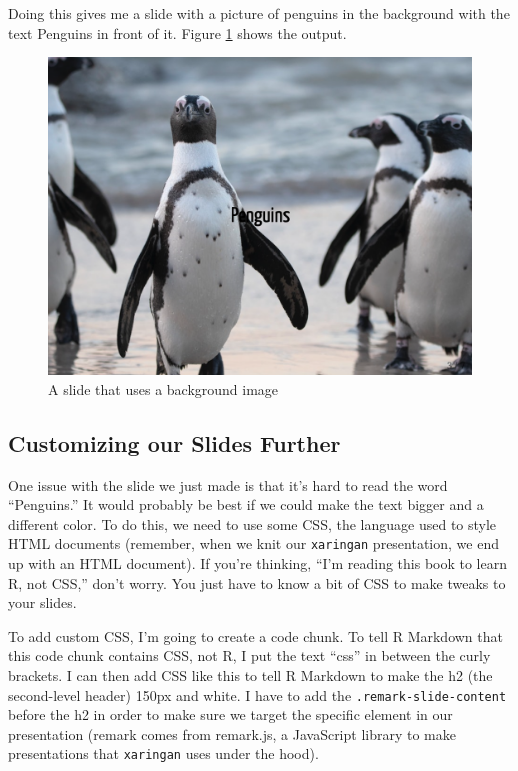 \documentclass[
]{book}
\begin{document}
Doing this gives me a slide with a picture of penguins in the background with the text Penguins in front of it. Figure \ref{fig:xaringan-background-image} shows the output.

\begin{figure}
\includegraphics[width=1\linewidth]{assets/xaringan-background-image} \caption{A slide that uses a background image}\label{fig:xaringan-background-image}
\end{figure}

\hypertarget{customizing-our-slides-further}{%
\subsection*{Customizing our Slides Further}\label{customizing-our-slides-further}}

One issue with the slide we just made is that it's hard to read the word ``Penguins.'' It would probably be best if we could make the text bigger and a different color. To do this, we need to use some CSS, the language used to style HTML documents (remember, when we knit our \texttt{xaringan} presentation, we end up with an HTML document). If you're thinking, ``I'm reading this book to learn R, not CSS,'' don't worry. You just have to know a bit of CSS to make tweaks to your slides.

To add custom CSS, I'm going to create a code chunk. To tell R Markdown that this code chunk contains CSS, not R, I put the text ``css'' in between the curly brackets. I can then add CSS like this to tell R Markdown to make the h2 (the second-level header) 150px and white. I have to add the \texttt{.remark-slide-content} before the h2 in order to make sure we target the specific element in our presentation (remark comes from remark.js, a JavaScript library to make presentations that \texttt{xaringan} uses under the hood).
\end{document}
